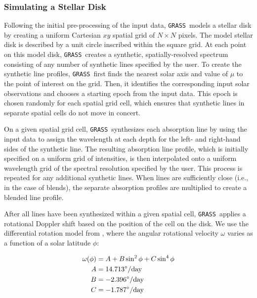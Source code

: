 \documentclass[twocolumn]{aastex63}
\newcommand{\grass}{\texttt{GRASS}}
\begin{document}
\subsubsection{Simulating a Stellar Disk} \label{sec:resolved_disk}
Following the initial pre-processing of the input data, \grass\ models a stellar disk by creating a uniform Cartesian $xy$ spatial grid of $N \times N$ pixels. The model stellar disk is described by a unit circle inscribed within the square grid. At each point on this model disk, \grass\ creates a synthetic, spatially-resolved spectrum consisting of any number of synthetic lines specified by the user. To create the synthetic line profiles, \grass\ first finds the nearest solar axis and value of $\mu$ to the point of interest on the grid. Then, it identifies the corresponding input solar observations and chooses a starting epoch from the input data. This epoch is chosen randomly for each spatial grid cell, which ensures that synthetic lines in separate spatial cells do not move in concert. \par 

On a given spatial grid cell, \grass\ synthesizes each absorption line by using the input data to assign the wavelength at each depth for the left- and right-hand sides of the synthetic line. The resulting absorption line profile, which is initially specified on a uniform grid of intensities, is then interpolated onto a uniform wavelength grid of the spectral resolution specified by the user. This process is repeated for any additional synthetic lines. When lines are sufficiently close (i.e., in the case of blends), the separate absorption profiles are multiplied to create a blended line profile.  \par 

After all lines have been synthesized within a given spatial cell, \grass\ applies a rotational Doppler shift based on the position of the cell on the disk. We use the differential rotation model from \citet{Snodgrass1990}, where the angular rotational velocity $\omega$ varies as a function of a solar latitude $\phi$:

\begin{align}
    \omega(\phi) &= A + B \sin^2\phi + C \sin^4 \phi \\
    A &= 14.713 ^{\circ}/{\rm day} \\
    B &= -2.396 ^{\circ}/{\rm day} \\
    C &= -1.787 ^{\circ}/{\rm day}
\end{align}
\end{document}
